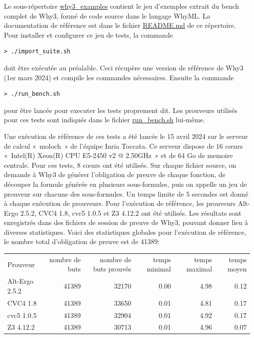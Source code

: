 \documentclass[a4paper,11pt]{article}
\begin{document}
Le sous-répertoire \url{why3_examples} contient le jeu d'exemples
extrait du bench complet de Why3, formé de code source dans le langage
WhyML. La documentation de référence est dans le fichier \url{README.md} de ce répertoire.
Pour installer et configurer ce jeu de tests, la commande
\begin{lstlisting}
> ./import_suite.sh
\end{lstlisting}
doit être exécutée au préalable. Ceci récupère une version de
référence de Why3 (1er mars 2024) et compile les commandes nécessaires. Ensuite la commande
\begin{lstlisting}
> ./run_bench.sh
\end{lstlisting}
pour être lancée pour executer les tests proprement dit. Les prouveurs
utilisés pour ces tests sont indiqués dans le fichier
\url{run_bench.sh} lui-même.

Une exécution de référence de ces tests a été lancée le 15 avril 2024
sur le serveur de calcul «~moloch~» de l'équipe Inria Toccata. Ce
serveur dispose de 16 c{\oe}urs «~Intel(R) Xeon(R) CPU E5-2450 v2 @
2.50GHz~» et de 64 Go de memoire centrale. Pour ces tests, 8 c{\oe}urs
ont été utilisés. Sur chaque fichier source, on demande à Why3 de
générer l'obligation de preuve de chaque fonction, de découper la
formule générée en plusieurs sous-formules, puis on appelle un jeu de
prouveur sur chacune des sous-formules. Un temps limite de 5 secondes est donné à chaque exécution de prouveurs. Pour l'exécution de référence,
les prouveurs Alt-Ergo 2.5.2, CVC4 1.8, cvc5 1.0.5 et Z3 4.12.2 ont
été utilisés. Les résultats sont enregistrés dans des fichiers de
session de preuve de Why3, pouvant donner lieu à diverses
statistiques. Voici des statistiques globales pour l'exécution de
référence, le nombre total d'obligation de preuve est de 41389:
\begin{center}
  \begin{tabular}{|l|r|r|r|r|r|}
    \hline
  \rowcolor{gray!50} Prouveur
  & \multicolumn{1}{p{0.13\textwidth}|}{nombre de buts}
  & \multicolumn{1}{p{0.13\textwidth}|}{nombre de buts prouvés}
  & \multicolumn{1}{p{0.13\textwidth}|}{temps minimal}
  & \multicolumn{1}{p{0.13\textwidth}|}{temps maximal}
  & \multicolumn{1}{p{0.13\textwidth}|}{temps moyen}
  \\
  Alt-Ergo 2.5.2                & 41389 & 32170 &  0.00  & 4.98 &  0.12 \\
  CVC4 1.8                      & 41389 & 33650 &  0.01  & 4.81 &  0.17 \\
  cvc5 1.0.5                    & 41389 & 32904 &  0.01  & 4.92 &  0.17 \\
    Z3 4.12.2                     & 41389 & 30713 &  0.01  & 4.96 &  0.07 \\
    \hline
\end{tabular}
\end{center}
\end{document}
